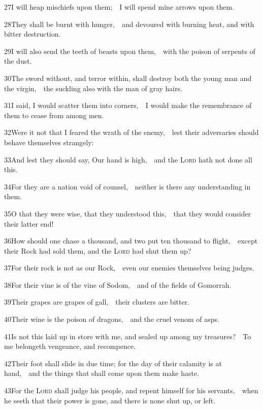 27\enspace I will heap mischiefs upon them;\ \star\ I will spend mine arrows upon them.

28\enspace They shall be burnt with hunger,\ \star\ and devoured with burning heat, and with bitter destruction.

29\enspace I will also send the teeth of beasts upon them,\ \star\ with the poison of serpents of the dust.

30\enspace The sword without, and terror within, shall destroy both the young man and the virgin,\ \star\ the suckling also with the man of gray hairs.

31\enspace I said, I would scatter them into corners,\ \star\ I would make the remembrance of them to cease from among men.

32\enspace Were it not that I feared the wrath of the enemy,\ \star\ lest their adversaries should behave themselves strangely:

33\enspace And lest they should say, Our hand is high,\ \star\ and the {\scshape Lord} hath not done all this.

34\enspace For they are a nation void of counsel,\ \star\ neither is there any understanding in them.

35\enspace O that they were wise, that they understood this,\ \star\ that they would consider their latter end!

36\enspace How should one chase a thousand, and two put ten thousand to flight,\ \star\ except their Rock had sold them, and the {\scshape Lord} had shut them up?

37\enspace For their rock is not as our Rock,\ \star\ even our enemies themselves being judges.

38\enspace For their vine is of the vine of Sodom,\ \star\ and of the fields of Gomorrah.

39\enspace Their grapes are grapes of gall,\ \star\ their clusters are bitter.

40\enspace Their wine is the poison of dragons,\ \star\ and the cruel venom of asps.

41\enspace Is not this laid up in store with me, and sealed up among my treasures?\ \star\ To me belongeth vengeance, and recompence.

42\enspace Their foot shall slide in due time; for the day of their calamity is at hand,\ \star\ and the things that shall come upon them make haste.

43\enspace For the {\scshape Lord} shall judge his people, and repent himself for his servants,\ \star\ when he seeth that their power is gone, and there is none shut up, or left.

